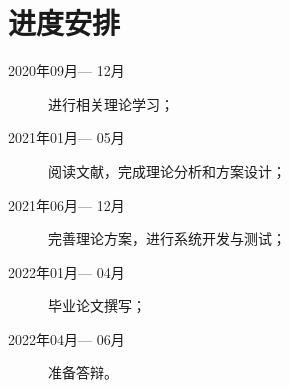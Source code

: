 \section{进度安排}

\begin{description}
\item[2020年09月— 12月] 进行相关理论学习；
\item[2021年01月— 05月] 阅读文献，完成理论分析和方案设计；
\item[2021年06月— 12月] 完善理论方案，进行系统开发与测试；
\item[2022年01月— 04月] 毕业论文撰写；
\item[2022年04月— 06月] 准备答辩。
\end{description}